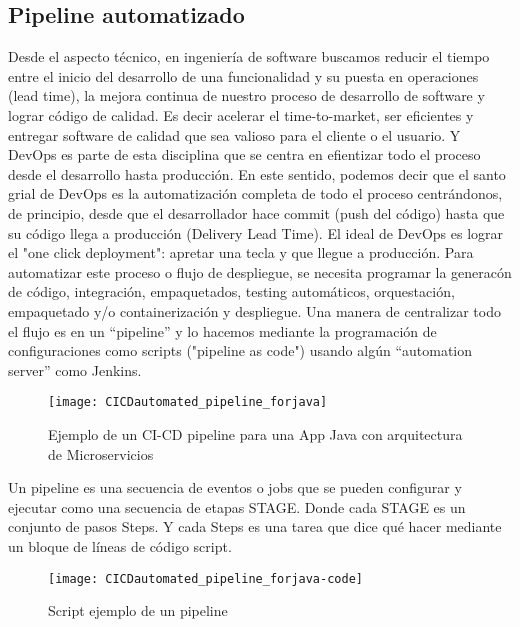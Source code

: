 \subsection{Pipeline automatizado}

Desde el aspecto técnico, en ingeniería de software buscamos reducir el tiempo entre el inicio del desarrollo de una funcionalidad y su puesta en operaciones (lead time), la mejora continua de nuestro proceso de desarrollo de software y lograr código de calidad. Es decir acelerar el time-to-market, ser eficientes y entregar software de calidad que sea valioso para el cliente o el usuario. Y DevOps es parte de esta disciplina que se centra en efientizar todo el proceso desde el desarrollo hasta producción. En este sentido, podemos decir que el santo grial de DevOps es la automatización completa de todo el proceso centrándonos, de principio, desde que el desarrollador hace commit (push del código) hasta que su código llega a producción (Delivery Lead Time). El ideal de DevOps es lograr el "one click deployment": apretar una tecla y que llegue a producción. Para automatizar este proceso o flujo de despliegue, se necesita programar la generacón de código, integración, empaquetados, testing automáticos, orquestación, empaquetado y/o containerización y despliegue. Una manera de centralizar todo el flujo es en un “pipeline” y lo hacemos mediante la programación de configuraciones como scripts ("pipeline as code") usando algún “automation server” como Jenkins. 

\begin{figure}[h]
  \centering
  \texttt{[image: CICDautomated\_pipeline\_forjava]}
  \caption{Ejemplo de un CI-CD pipeline para una App Java con arquitectura de Microservicios}
  \centering
  \label{fig:CICDautomated_pipeline_forjava} %
\end{figure}
\FloatBarrier %


Un pipeline es una secuencia de eventos o jobs que se pueden configurar y ejecutar como una secuencia de etapas STAGE. Donde cada STAGE es un conjunto de pasos Steps. Y cada Steps es una tarea que dice qué hacer mediante un bloque de líneas de código script.

\begin{figure}[h]
  \centering
  \texttt{[image: CICDautomated\_pipeline\_forjava-code]}
  \caption{Script ejemplo de un pipeline}
  \centering
  \label{fig:CICDautomated_pipeline_forjava-code} %
\end{figure}
\FloatBarrier %

